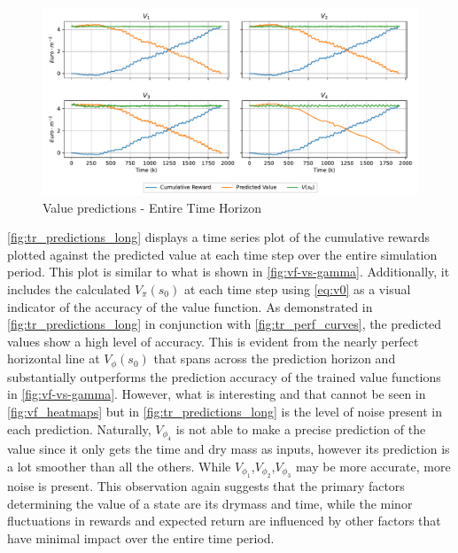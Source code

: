 \begin{figure}[H]
	\centering
	\includegraphics[width = \textwidth]{figures/vf_time_predictions_long-eps-converted-to.pdf}
	\caption{Value predictions - Entire Time Horizon}
	\label{fig:tr_predictions_long}
\end{figure}

\autoref{fig:tr_predictions_long} displays a time series plot of the cumulative rewards plotted against the predicted value at each time step over the entire simulation period. This plot is similar to what is shown in \autoref{fig:vf-vs-gamma}. Additionally, it includes the calculated $V_\pi (s_0)$ at each time step using \autoref{eq:v0} as a visual indicator of the accuracy of the value function. As demonstrated in \autoref{fig:tr_predictions_long} in conjunction with \autoref{fig:tr_perf_curves}, the predicted values show a high level of accuracy. This is evident from the nearly perfect horizontal line at $V_\phi (s_0)$ that spans across the prediction horizon and substantially outperforms the prediction accuracy of the trained value functions in \autoref{fig:vf-vs-gamma}.  However, what is interesting and that cannot be seen in \autoref{fig:vf_heatmaps} but in \autoref{fig:tr_predictions_long} is the level of noise present in each prediction. Naturally, $V_{\phi_4}$ is not able to make a precise prediction of the value since it only gets the time and dry mass as inputs, however its prediction is a lot smoother than all the others. While $V_{\phi_1}$,$V_{\phi_2}$,$V_{\phi_3}$ may be more accurate, more noise is present. This observation again suggests that the primary factors determining the value of a state are its drymass and time, while the minor fluctuations in rewards and expected return are influenced by other factors that have minimal impact over the entire time period.



